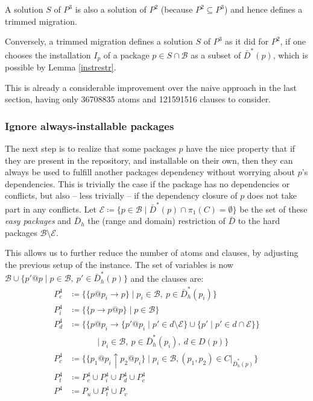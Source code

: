 \documentclass[halfparskip,11pt]{scrartcl}
\begin{document}
A solution $S$ of $P^3$ is also a solution of $P^2$ (because $P^2 \subseteq P^3$) and hence defines a trimmed migration.

Conversely, a trimmed migration defines a solution $S$ of $P^3$ as it did for $P^2$, if one chooses the installation $I_p$ of a package $p\in S\cap \mathcal B$ as a subset of $\bar D^*(p)$, which is possible by Lemma \ref{instrestr}.

This is already a considerable improvement over the naive approach in the last section, having only 36708835 atoms and 121591516 clauses to consider.

\subsubsection{Ignore always-installable packages}

The next step is to realize that some packages $p$ have the nice property that if they are present in the repository, and installable on their own, then they can always be used to fulfill another packages dependency without worrying about $p$’s dependencies. This is trivially the case if the package has no dependencies or conflicts, but also – less trivially – if the dependency closure of $p$ does not take part in any conflicts. Let $\mathcal E \coloneqq \{ p\in \mathcal B \mid  \bar D^*(p) \cap \pi_1(C) = \emptyset \}$ be the set of these \emph{easy packages} and $\bar D_h$ the (range and domain) restriction of $\bar D$ to the hard packages $\mathcal B\setminus \mathcal E$.


This allows us to further reduce the number of atoms and clauses, by adjusting the previous setup of the instance. The set of variables is now $\mathcal B \cup \{p'@p \mid p \in \mathcal B,\  p'\in \bar D_h^*(p)\}$ and the clauses are: 
\begin{align*}
P^4_e &\coloneqq \{ \{p@p_i \to p\} \mid p_i \in\mathcal B,\ p\in \bar D_h^*(p_i)\} \\
P^4_i &\coloneqq \{ \{p \to  p@p\} \mid p \in\mathcal B\} \\
P^4_d &\coloneqq \{ \{p@p_i \to \{p'@p_i \mid p'\in d\setminus \mathcal E\} \cup \{p' \mid p'\in d\cap \mathcal E\}\} \\
&\quad\quad\quad \mid p_i\in \mathcal B,\ p \in \bar D_h^*(p_i), \ d \in D(p)\}\\
P^4_c &\coloneqq \{ \{p_1@p_i \uparrow p_2@p_i\} \mid p_i\in \mathcal B, (p_1,p_2)\in C|_{\bar D_h^*(p)}\}\\
P^4_t &\coloneqq P^4_e \cup P^4_i \cup P^4_d \cup P^4_c \\
P^4 &\coloneqq P_u \cup P^4_t \cup P_v
\end{align*}
\end{document}
